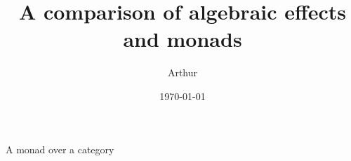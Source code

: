 \documentclass[a4paper,10pt]{article}
\title{A comparison of algebraic effects and monads}
\author{Arthur}
\date{\today}
\begin{document}
A monad over a category 

\medskip



\end{document}
